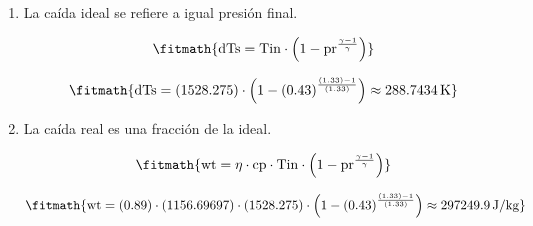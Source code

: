 \begin{enumerate}

\item La caída ideal se refiere a igual presión final.

\[\fitmath{\mathrm{dTs}=\mathrm{Tin}\cdot \left(1-{\mathrm{pr}}^{\frac{\gamma-1}{\gamma}}\right)}\]

\[\fitmath{\mathrm{dTs}=(1528.275)\cdot \left(1-{(0.43)}^{\frac{(1.33)-1}{(1.33)}}\right)\approx 288.7434\,\mathrm{K}}\]

\item La caída real es una fracción de la ideal.

\[\fitmath{\mathrm{wt}=\eta\cdot \mathrm{cp}\cdot \mathrm{Tin}\cdot \left(1-{\mathrm{pr}}^{\frac{\gamma-1}{\gamma}}\right)}\]

\[\fitmath{\mathrm{wt}=(0.89)\cdot (1156.69697)\cdot (1528.275)\cdot \left(1-{(0.43)}^{\frac{(1.33)-1}{(1.33)}}\right)\approx 297249.9\,\mathrm{J/kg}}\]

\end{enumerate}
